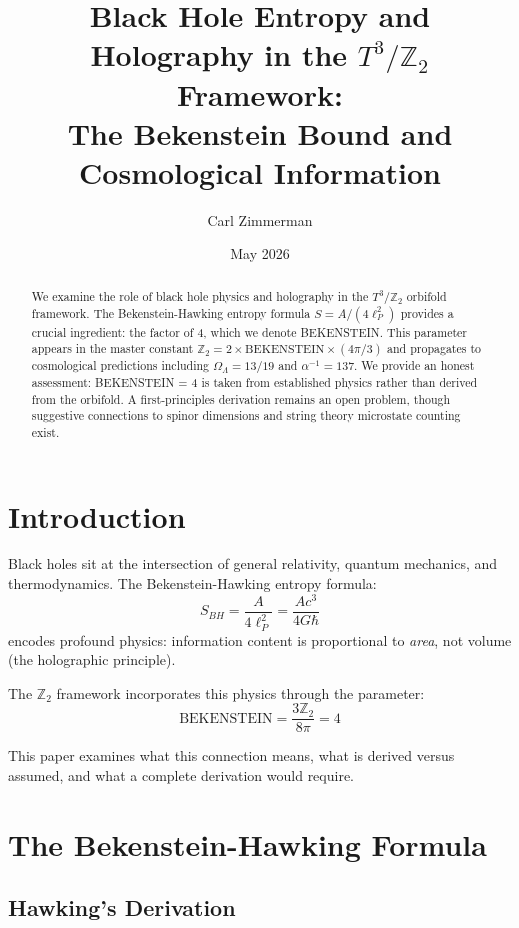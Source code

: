 \documentclass[12pt,a4paper]{article}
\title{Black Hole Entropy and Holography in the $T^3/\mathbb{Z}_2$ Framework:\\
The Bekenstein Bound and Cosmological Information}
\author{Carl Zimmerman}
\date{May 2026}
\begin{document}
\maketitle

\begin{abstract}
We examine the role of black hole physics and holography in the $T^3/\mathbb{Z}_2$ orbifold framework. The Bekenstein-Hawking entropy formula $S = A/(4\ell_P^2)$ provides a crucial ingredient: the factor of 4, which we denote BEKENSTEIN. This parameter appears in the master constant $\mathbb{Z}_2 = 2 \times \text{BEKENSTEIN} \times (4\pi/3)$ and propagates to cosmological predictions including $\Omega_\Lambda = 13/19$ and $\alpha^{-1} = 137$. We provide an honest assessment: BEKENSTEIN = 4 is taken from established physics rather than derived from the orbifold. A first-principles derivation remains an open problem, though suggestive connections to spinor dimensions and string theory microstate counting exist.
\end{abstract}

\section{Introduction}

Black holes sit at the intersection of general relativity, quantum mechanics, and thermodynamics. The Bekenstein-Hawking entropy formula:
\begin{equation}
S_{BH} = \frac{A}{4\ell_P^2} = \frac{Ac^3}{4G\hbar}
\end{equation}
encodes profound physics: information content is proportional to \textit{area}, not volume (the holographic principle).

The $\mathbb{Z}_2$ framework incorporates this physics through the parameter:
\begin{equation}
\text{BEKENSTEIN} = \frac{3\mathbb{Z}_2}{8\pi} = 4
\end{equation}

This paper examines what this connection means, what is derived versus assumed, and what a complete derivation would require.

\section{The Bekenstein-Hawking Formula}

\subsection{Hawking's Derivation}
\end{document}
